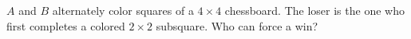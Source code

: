 $A$ and $B$ alternately color squares of a $4 \times 4$ chessboard. The loser is the one who first completes a colored $2 \times 2$ subsquare. Who can force a win?
